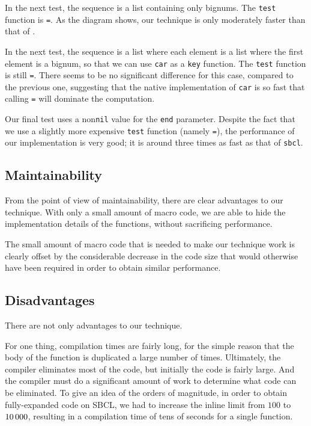 
In the next test, the sequence is a list containing only bignums.  The
\texttt{test} function is \texttt{=}.  As the diagram shows, our
technique is only moderately faster than that of \sbcl{}.


In the next test, the sequence is a list where each element is a list
where the first element is a bignum, so that we can use \texttt{car}
as a \texttt{key} function.  The \texttt{test} function is still
\texttt{=}.  There seems to be no significant difference for this
case, compared to the previous one, suggesting that the native
implementation of \texttt{car} is so fast that calling \texttt{=} will
dominate the computation.


Our final test uses a non\texttt{nil} value for the \texttt{end}
parameter.  Despite the fact that we use a slightly more expensive
\texttt{test} function (namely \texttt{=}), the performance of our
implementation is very good; it is around three times as fast as that
of \texttt{sbcl}.


\subsection{Maintainability}

From the point of view of maintainability, there are clear advantages
to our technique.  With only a small amount of macro code, we are able
to hide the implementation details of the functions, without
sacrificing performance.

The small amount of macro code that is needed to make our technique
work is clearly offset by the considerable decrease in the code size
that would otherwise have been required in order to obtain similar
performance.

\subsection{Disadvantages}

There are not only advantages to our technique.

For one thing, compilation times are fairly long, for the simple
reason that the body of the function is duplicated a large number of
times.  Ultimately, the compiler eliminates most of the code, but
initially the code is fairly large.  And the compiler must do a
significant amount of work to determine what code can be eliminated.
To give an idea of the orders of magnitude, in order to obtain
fully-expanded code on SBCL, we had to increase the inline limit from
$100$ to $10\thinspace000$, resulting in a compilation time of tens of
seconds for a single function.

